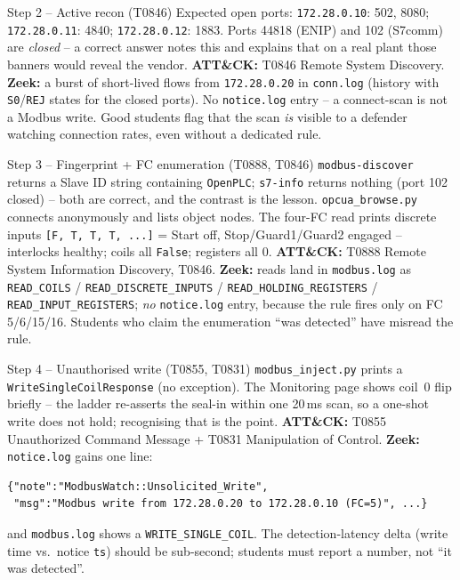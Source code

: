 \documentclass[11pt,a4paper]{article}
\begin{document}
\begin{solutionbox}{Step 2 -- Active recon (T0846)}
Expected open ports: \texttt{172.28.0.10}: 502, 8080;
\texttt{172.28.0.11}: 4840; \texttt{172.28.0.12}: 1883. Ports 44818
(ENIP) and 102 (S7comm) are \emph{closed} -- a correct answer notes
this and explains that on a real plant those banners would reveal the
vendor. \textbf{ATT\&CK:} T0846 Remote System Discovery. \textbf{Zeek:}
a burst of short-lived flows from \texttt{172.28.0.20} in
\texttt{conn.log} (history with \texttt{S0}/\texttt{REJ} states for the
closed ports). No \texttt{notice.log} entry -- a connect-scan is not a
Modbus write. Good students flag that the scan \emph{is} visible to a
defender watching connection rates, even without a dedicated rule.
\end{solutionbox}

\begin{solutionbox}{Step 3 -- Fingerprint + FC enumeration (T0888, T0846)}
\texttt{modbus-discover} returns a Slave ID string containing
\texttt{OpenPLC}; \texttt{s7-info} returns nothing (port 102 closed) --
both are correct, and the contrast is the lesson.
\texttt{opcua\_browse.py} connects anonymously and lists object nodes.
The four-FC read prints discrete inputs
\texttt{[F, T, T, T, ...]} = Start off, Stop/Guard1/Guard2 engaged --
interlocks healthy; coils all \texttt{False}; registers all 0.
\textbf{ATT\&CK:} T0888 Remote System Information Discovery, T0846.
\textbf{Zeek:} reads land in \texttt{modbus.log} as
\texttt{READ\_COILS} / \texttt{READ\_DISCRETE\_INPUTS} /
\texttt{READ\_HOLDING\_REGISTERS} / \texttt{READ\_INPUT\_REGISTERS};
\emph{no} \texttt{notice.log} entry, because the rule fires only on
FC 5/6/15/16. Students who claim the enumeration ``was detected'' have
misread the rule.
\end{solutionbox}

\begin{solutionbox}{Step 4 -- Unauthorised write (T0855, T0831)}
\texttt{modbus\_inject.py} prints a
\texttt{WriteSingleCoilResponse} (no exception). The Monitoring page
shows coil~0 flip briefly -- the ladder re-asserts the seal-in within
one 20\,ms scan, so a one-shot write does not hold; recognising that is
the point. \textbf{ATT\&CK:} T0855 Unauthorized Command Message +
T0831 Manipulation of Control. \textbf{Zeek:} \texttt{notice.log} gains
one line:
\begin{lstlisting}
{"note":"ModbusWatch::Unsolicited_Write",
 "msg":"Modbus write from 172.28.0.20 to 172.28.0.10 (FC=5)", ...}
\end{lstlisting}
and \texttt{modbus.log} shows a \texttt{WRITE\_SINGLE\_COIL}. The
detection-latency delta (write time vs.\ notice \texttt{ts}) should be
sub-second; students must report a number, not ``it was detected''.
\end{solutionbox}
\end{document}
